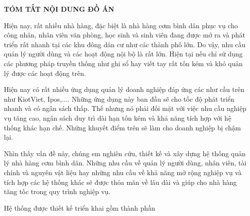 \documentclass[../DoAn.tex]{subfiles}
\begin{document}
    \begin{center}
        \Large{\textbf{TÓM TẮT NỘI DUNG ĐỒ ÁN}}
    \end{center}
    \vspace{1cm}

    Hiện nay, rất nhiều nhà hàng, đặc biệt là nhà hàng cơm bình dân phục vụ cho công nhân, nhân viên văn phòng, học sinh và sinh viên đang được mở ra và phát triển rất nhanh tại các khu đông dân cư như các thành phố lớn. Do vậy, nhu cầu quản lý người dùng và các hoạt động nội bộ là rất lớn. Hiện tại nếu chỉ sử dụng các phương pháp truyền thống như ghi sổ hay viết tay rất tốn kém và khó quản lý được các hoạt động trên. 

    Hiện nay có rất nhiều ứng dụng quản lý doanh nghiệp đáp ứng các như cầu trên như KiotViet, Ipos,.... Những ứng dụng này ban đầu sẽ cho tốc độ phát triển nhanh và có ngân sách thấp. Thế nhưng nó phải đối mặt với việc nhu cầu nghiệp vụ tăng cao, ngân sách duy trì dài hạn tốn kém và khả năng tích hợp với hệ thống khác hạn chế. Những khuyết điểm trên sẽ làm cho doanh nghiệp bị chậm lại. 

    Nhìn thấy vấn đề này, chúng em nghiên cứu, thiết kế và xây dựng hệ thống quản lý nhà hàng cơm bình dân. Những nhu cầu về quản lý người dùng, nhân viên, tài chính và nguyên vật liệu hay những nhu cầu về khả năng mở rộng nghiệp vụ và tích hợp các hệ thống khác sẽ được thỏa mãn về lâu dài và giúp cho nhà hàng tăng tốc trong quy trình nghiệp vụ.

    Hệ thống được thiết kế triển khai gồm  thành phần
\end{document}
